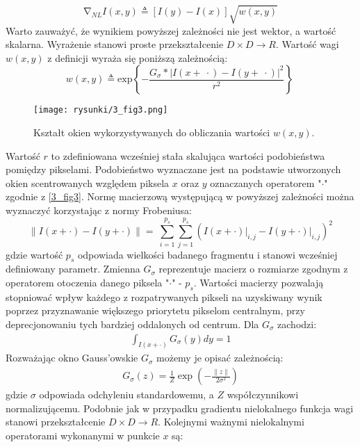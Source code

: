 \documentclass[12pt, twoside, openany]{report}
\theoremstyle{definition}
\begin{document}
\begin{equation}
{\mathrm{\nabla }}_{NL}I\left(x,y\right)\triangleq \left[I\left(y\right)-I\left(x\right)\right]\sqrt{w(x,y)}
\label{NLGRAD}
\end{equation}
Warto zauważyć, że wynikiem powyższej zależności nie jest wektor, a wartość skalarna. Wyrażenie stanowi proste przekształcenie $D \times D\longrightarrow R$. Wartość wagi $w(x,y)$ z definicji wyraża się poniższą zależnością:
\begin{equation}
w\left(x,y\right)\triangleq {\mathrm{exp} \left\{-\frac{G_{\sigma }*{\left|I\left(x+\ \cdot \right)-I\left(y+\ \cdot \right)\right|}^2}{r^2}\right\}\ }
\label{NLWEIGHT}
\end{equation}
\begin{figure}[!h]
	\centering
	\texttt{[image: rysunki/3\_fig3.png]}
	\caption{Kształt okien wykorzystywanych do obliczania wartości $w(x,y)$.}
	\label{3_fig3}
\end{figure}
Wartość $r$ to zdefiniowana wcześniej stała skalująca wartości podobieństwa pomiędzy pikselami. Podobieństwo wyznaczane jest na podstawie utworzonych okien scentrowanych względem piksela $x$ oraz $y$ oznaczanych operatorem "$\cdot$" zgodnie z \autoref{3_fig3}. Normę macierzową występującą w powyższej zależności można wyznaczyć korzystając z normy Frobeniusa:
\begin{equation}
{\|I\left(x+\cdot \right)-I\left(y+\cdot \right)\|}=\ \sum^{p_s}_{i=1}{\sum^{p_s}_{j=1}{{\left(I(x+\cdot)\big|_{i,j}-I(y+\cdot)\big|_{i,j}\right)}^2}}
\label{FROBENIUS}
\end{equation}
gdzie wartość $p_s$ odpowiada wielkości badanego fragmentu i stanowi wcześniej definiowany parametr. Zmienna $G_\sigma$ reprezentuje macierz o rozmiarze zgodnym z operatorem otoczenia danego piksela "$\cdot$" - $p_s$. Wartości macierzy pozwalają stopniować wpływ każdego z rozpatrywanych pikseli na uzyskiwany wynik poprzez przyznawanie większego priorytetu pikselom centralnym, przy deprecjonowaniu tych bardziej oddalonych od centrum. Dla $G_\sigma$ zachodzi:
\begin{align}
\int_{I(x+\cdot)}G_{\sigma}(y)dy = 1
\end{align}
Rozważając okno Gauss'owskie $G_\sigma$ możemy je opisać zależnością:
\begin{align}
G_\sigma(z)=\frac{1}{Z}\exp(-\frac{\|z\|}{2\sigma^2})
\label{oknoGaussowskie}
\end{align}
gdzie $\sigma$ odpowiada odchyleniu standardowemu, a $Z$ współczynnikowi normalizującemu. Podobnie jak w przypadku gradientu nielokalnego funkcja wagi stanowi przekształcenie $D \times D\longrightarrow R$. Kolejnymi ważnymi nielokalnymi operatorami wykonanymi w punkcie $x$ są: 
\end{document}
